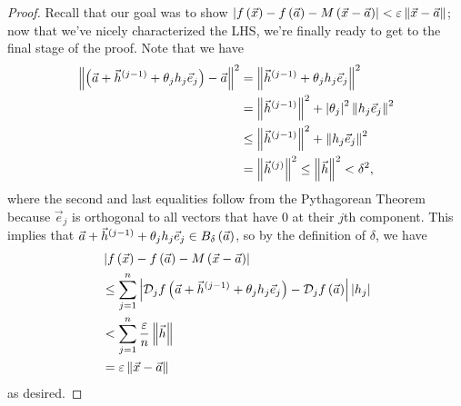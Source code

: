 \documentclass[main.tex]{subfiles}
\begin{document}
\begin{proof}
    Recall that our goal was to show $\left\lvert f\left( \vec{x} \right) - f\left( \vec{a} \right) - M\left( \vec{x} - \vec{a} \right) \right\rvert < \varepsilon\left\lVert \vec{x} - \vec{a} \right\rVert$; now that we've nicely characterized the LHS, we're finally ready to get to the final stage of the proof. Note that we have
    \begin{align*}
        \left\lVert \left( \vec{a} + \vec{h}^{(j - 1)} + \theta_jh_j\vec{e}_j \right) - \vec{a} \right\rVert^2 &= \left\lVert \vec{h}^{(j - 1)} + \theta_jh_j\vec{e}_j \right\rVert^2 \\
        &= \left\lVert \vec{h}^{(j - 1)} \right\rVert^2 + \left\lvert \theta_j \right\rvert^2 \left\lVert h_j\vec{e}_j \right\rVert^2 \\
        &\le \left\lVert \vec{h}^{(j - 1)} \right\rVert^2 + \left\lVert h_j\vec{e}_j \right\rVert^2 \\
        &= \left\lVert \vec{h}^{(j)} \right\rVert^2 \le \left\lVert \vec{h} \right\rVert^2 < \delta^2,
    \end{align*}
    where the second and last equalities follow from the Pythagorean Theorem because $\vec{e}_j$ is orthogonal to all vectors that have $0$ at their $j$th component. This implies that $\vec{a} + \vec{h}^{(j - 1)} + \theta_jh_j\vec{e}_j \in B_\delta\left( \vec{a} \right)$, so by the definition of $\delta$, we have
    \begin{align*}
        &\left\lvert f\left( \vec{x} \right) - f\left( \vec{a} \right) - M\left( \vec{x} - \vec{a} \right) \right\rvert \\
        &\le  \sum_{j = 1}^n \left\lvert \mathcal{D}_jf\left( \vec{a} + \vec{h}^{(j - 1)} + \theta_jh_j\vec{e}_j \right) - \mathcal{D}_jf\left( \vec{a} \right) \right\rvert\left\lvert h_j \right\rvert \\
        &< \sum_{j = 1}^n \frac{\varepsilon}{n}\left\lVert \vec{h} \right\rVert \\
        &= \varepsilon\left\lVert \vec{x} - \vec{a} \right\rVert
    \end{align*}
    as desired.
\end{proof}
\end{document}
